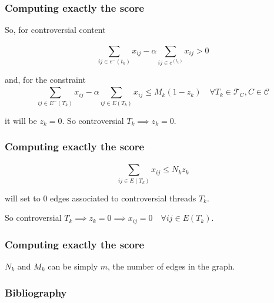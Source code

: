 \documentclass{beamer}
\begin{document}
\begin{frame}[c]
    \frametitle{Computing exactly the score}
    So, for controversial content

    \begin{equation}
        \sum^{}_{ij \in e^{-} (t_{k} )} x_{ij} -
        \alpha {\sum^{}_{ij \in e^ (t_{k} )} x_{ij} } > 0
    \end{equation}

    and, for the constraint
    \begin{equation}
        \sum^{}_{ij \in E^{-} (T_k)} x_{ij} - \alpha \sum^{}_{ij \in E(T_k)}
        x_{ij} \leq M_k(1 -z_{k} ) \quad \forall T_{k} \in \mathcal{T} _{C}, C \in
        \mathcal{C}
    \end{equation}

    it will be $z_{k} = 0$. So controversial $T_{k} \implies z_{k} = 0$.
\end{frame}

\begin{frame}[c]
    \frametitle{Computing exactly the score}
    \begin{equation}
        \sum^{}_{ij \in E(T_{k} )} x_{ij} \leq N_{k} z_{k}
    \end{equation}

    will set to $0$ edges associated to controversial threads $T_{k} $.

    So controversial $T_{k} \implies z_{k} = 0 \implies x_{ij} = 0 \quad \forall ij
    \in E(T_{k} )$.

\end{frame}

\begin{frame}[c]
    \frametitle{Computing exactly the score}
    $N_{k} $ and $M_{k} $ can be simply $m$, the number of edges in the graph.
\end{frame}

\begin{frame}[c]
    \frametitle{Bibliography}
    \printbibliography
\end{frame}
\end{document}
